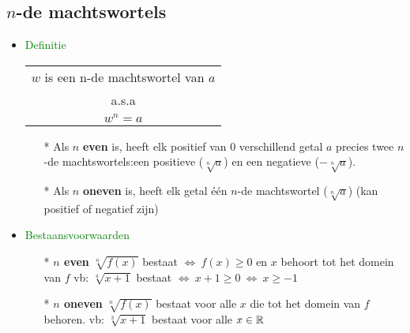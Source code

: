 \subsection{$n$-de machtswortels} \label{wortelvormen}
\hypertarget{wortelvormen}{}
\begin{itemize}%
\item \textcolor{green}{Definitie}\newline
\begin{tabular}{c}
$w$ is een n-de machtswortel van $a$ \\
a.s.a\\
$w^n=a$
\end{tabular}\newline
\begin{itemize}
\item[*]Als $n$ {\bf even} is, heeft elk positief van 0 verschillend getal $a$ precies twee $n$-de machtswortels:\newline een positieve ($\sqrt[n]{a}$) en een negatieve ($-\sqrt[n]{a}$).\newline
\item[*]Als $n$ {\bf oneven} is, heeft elk getal \'e\'en $n$-de machtswortel ($\sqrt[n]{a}$) (kan positief of negatief zijn)
\end{itemize}
\item \textcolor{green}{Bestaansvoorwaarden}
\begin{itemize}%
\item[*] {\bf $n$ even}\newline\newline
$\sqrt[n]{f(x)}$ bestaat $\Leftrightarrow \:f(x)\geq 0$ en $x$ behoort tot het domein van $f$\newline\newline
vb: $\sqrt[4]{x+1}$ bestaat $\Leftrightarrow \: x+1\geq 0 \:\Leftrightarrow\: x\geq -1$
\item[*] {\bf $n$ oneven}\newline\newline
$\sqrt[n]{f(x)}$ bestaat voor alle $x$ die tot het domein van $f$ behoren.\newline\newline
vb: $\sqrt[3]{x+1}$ bestaat voor alle $x \in \mathbb{R}$
\end{itemize}%
\end{itemize}%

